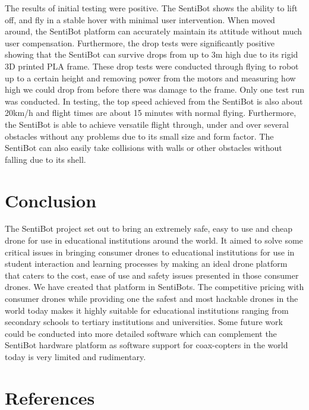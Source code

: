 \documentclass[12pt]{article}
\begin{document}
The results of initial testing were positive. The SentiBot shows the ability to lift off, and fly in a stable hover with minimal user intervention. When moved around, the SentiBot platform can accurately maintain its attitude without much user compensation. Furthermore, the drop tests were significantly positive showing that the SentiBot can survive drops from up to 3m high due to its rigid 3D printed PLA frame. These drop tests were conducted through flying to robot up to a certain height and removing power from the motors and measuring how high we could drop from before there was damage to the frame. Only one test run was conducted. In testing, the top speed achieved from the SentiBot is also about 20km/h and flight times are about 15 minutes with normal flying. Furthermore, the SentiBot is able to achieve versatile flight through, under and over several obstacles without any problems due to its small size and form factor. The SentiBot can also easily take collisions with walls or other obstacles without falling due to its shell. 

\section{Conclusion}

The SentiBot project set out to bring an extremely safe, easy to use and cheap drone for use in educational institutions around the world. It aimed to solve some critical issues in bringing consumer drones to educational institutions for use in student interaction and learning processes by making an ideal drone platform that caters to the cost, ease of use and safety issues presented in those consumer drones. We have created that platform in SentiBots. The competitive pricing with consumer drones while providing one the safest and most hackable drones in the world today makes it highly suitable for educational institutions ranging from secondary schools to tertiary institutions and universities. 
Some future work could be conducted into more detailed software which can complement the SentiBot hardware platform as software support for coax-copters in the world today is very limited and rudimentary.

\section{References}



\end{document}
